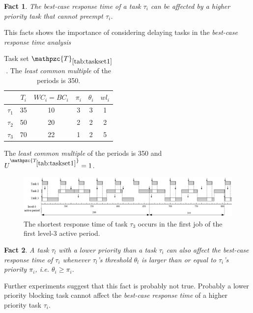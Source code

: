 \documentclass[fleqn]{article}
\newtheorem{fact}{Fact}
\begin{document}
\begin{fact}
	The best-case response time of a task $\tau_i$ can be affected by a higher priority task that cannot preempt $\tau_i$.
\end{fact}

This facts shows the importance of considering delaying tasks in the \textit{best-case response time analysis}

\begin{table}[H]
	\center
	\caption{Task set $\mathpzc{T}_{\ref{tab:taskset1}}$. The \textit{least common multiple} of the periods is 350.}
	\label{tab:taskset1}
	\begin{tabular}{c c c c c | c}
		\hline 
		& $T_i$ & $WC_i=BC_i$ & $\pi_i$ & $\theta_i$ &  $wl_i$\\ 
		\hline 
		$\tau_1$& 35 & 10  & 3 & 3 &  1\\ 
		$\tau_2$& 50 & 20  & 2 & 2 & 2 \\ 
		$\tau_3$& 70 & 22 & 1 & 2 & 5 \\
		\hline 
	\end{tabular}
	\small
	\item The \textit{least common multiple} of the periods is 350 and $U^{\mathpzc{T_{\ref{tab:taskset1}}}}=1$.
\end{table} 

\begin{figure}[H]
	\centering
	\includegraphics[width=1.1\linewidth]{figures/bcrt_ex1}
	\caption{The shortest response time of task $\tau_3$ occurs in the first job of the first level-3 active period.}
	\label{fig:bcrt1}
\end{figure}


\begin{fact}
	A task $\tau_l$ with a lower priority than a task $\tau_i$ can also affect the best-case response time of $\tau_i$ whenever $\tau_l$'s threshold $\theta_l$ is larger than or equal to $\tau_i$'s priority $\pi_i$, i.e. $\theta_i \geq \pi_i$.
\end{fact}

Further experiments suggest that this fact is probably not true. Probably a lower priority blocking task cannot affect the \textit{best-case response time} of a higher priority task $\tau_i$.
\end{document}
